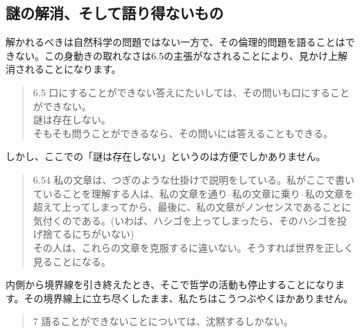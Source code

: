 \documentclass[11pt,a4paper]{jsbook}
\begin{document}
\subsection{謎の解消、そして語り得ないもの}
解かれるべきは自然科学の問題ではない一方で、その倫理的問題を語ることはできない。この身動きの取れなさは6.5の主張がなされることにより、見かけ上解消されることになります。
\begin{quote}
6.5 口にすることができない答えにたいしては、その問いも口にすることができない。\\
謎は存在しない。\\
そもそも問うことができるなら、その問いには答えることもできる。
\end{quote}
しかし、ここでの「謎は存在しない」というのは方便でしかありません。
\begin{quote}
6.54 私の文章は、つぎのような仕掛けで説明をしている。私がここで書いていることを理解する人は、私の文章を通り--私の文章に乗り--私の文章を超えて上ってしまってから、最後に、私の文章がノンセンスであることに気付くのである。(いわば、ハシゴを上ってしまったら、そのハシゴを投げ捨てるにちがいない)\\
その人は、これらの文章を克服するに違いない。そうすれば世界を正しく見ることになる。
\end{quote}
内側から境界線を引き終えたとき、そこで哲学の活動も停止することになります。その境界線上に立ち尽くしたまま、私たちはこうつぶやくほかありません。
\\
\begin{quote}
7 語ることができないことについては、沈黙するしかない。
\end{quote}
\newpage

\end{document}
